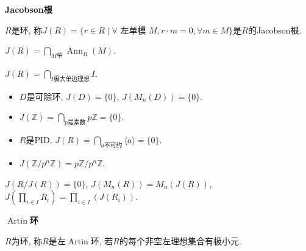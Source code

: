 \begin{definition}\textbf{Jacobson根}\par
    \qquad $R$是环, 称$J(R)=\{r\in R\mid\forall\text{ 左单模 }M, r\cdot m=0, \forall m\in M\}$是$R$的Jacobson根.\par
    \qquad $J(R)=\bigcap\limits_{M单}\operatorname{Ann}_R(M)$.
\end{definition}

\begin{proposition}
    $J(R)=\bigcap\limits_{I极大单边理想}I$.
\end{proposition}

\begin{example}
    \begin{itemize}
    \item[(1)] $D$是可除环, $J(D)=\{0\}$, $J(M_n(D))=\{0\}$.
    \item[(2)] $J(\mathbb{Z})=\bigcap\limits_{p是素数} p\mathbb{Z}=\{0\}$.
    \item[(3)] $R$是PID. $J(R)=\bigcap\limits_{a不可约}\langle a\rangle=\{0\}$.
    \item[(4)] $J(\mathbb{Z}/p^n\mathbb{Z})=p\mathbb{Z}/p^n\mathbb{Z}$.
    \end{itemize}
\end{example}

\begin{proposition}
    $J(R/J(R))=\{0\}$, $J(M_n(R))=M_n(J(R))$, $J(\prod_{i \in I} R_i) = \prod_{i \in I}(J (R_i))$.
\end{proposition}

\begin{definition} \textbf{$\operatorname{Artin}$环}\par
    \qquad $R$为环, 称$R$是左$\operatorname{Artin}$环, 若$R$的每个非空左理想集合有极小元.
\end{definition}

